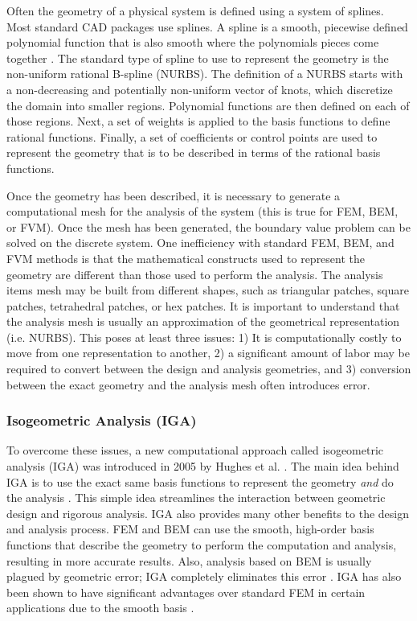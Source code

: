       Often the geometry of a physical system is defined using a system of splines.  Most standard CAD packages use splines.  A spline is a smooth, piecewise defined polynomial function that is also smooth where the polynomials pieces come together \cite{judd1998}.  The standard type of spline to use to represent the geometry is the non-uniform rational B-spline (NURBS). The definition of a NURBS starts with a non-decreasing and potentially non-uniform vector of knots, which discretize the domain into smaller regions. Polynomial functions are then defined on each of those regions. Next, a set of weights is applied to the basis functions to define rational functions. Finally, a set of coefficients or control points are used to represent the geometry that is to be described in terms of the rational basis functions.

      Once the geometry has been described, it is necessary to generate a computational mesh for the analysis of the system (this is true for FEM, BEM, or FVM).  Once the mesh has been generated, the boundary value problem can be solved on the discrete system.  One inefficiency with standard FEM, BEM, and FVM methods is that the mathematical constructs used to represent the geometry are different than those used to perform the analysis. The analysis items mesh may be built from different shapes, such as triangular patches, square patches, tetrahedral patches, or hex patches.  It is important to understand that the analysis mesh is usually an approximation of the geometrical representation (i.e. NURBS). This poses at least three issues: 1) It is computationally costly to move from one representation to another, 2) a significant amount of labor may be required to convert between the design and analysis geometries, and 3) conversion between the exact geometry and the analysis mesh often introduces error.

    \subsubsection{Isogeometric Analysis (IGA)} \label{ssub:isogeometric_analysis_iga}

      To overcome these issues, a new computational approach called isogeometric analysis (IGA) was introduced in 2005 by Hughes et al. \cite{hughes2005}. The main idea behind IGA is to use the exact same basis functions to represent the geometry \textit{and} do the analysis \cite{scott2013}. This simple idea streamlines the interaction between geometric design and rigorous analysis. IGA also provides many other benefits to the design and analysis process. FEM and BEM can use the smooth, high-order basis functions that describe the geometry to perform the computation and analysis, resulting in more accurate results. Also, analysis based on BEM is usually plagued by geometric error; IGA completely eliminates this error \cite{simpson2013}.  IGA has also been shown to have significant advantages over standard FEM in certain applications due to the smooth basis \cite{cottrell2006}.

